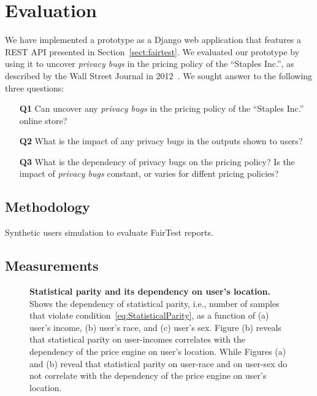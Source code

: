 \section{Evaluation}
\label{sect:evaluation}

We have implemented a \sysname prototype as a Django web application
that features a REST API presented in Section~\ref{sect:fairtest}.
We evaluated our prototype by using it to uncover {\it privacy bugs}
in the pricing policy of the ``Staples Inc.'', as described by the
Wall Street Journal in 2012~\cite{Staples}. We sought answer to
the following three questions:

\begin{enumerate}
  \item[{\bf Q1}] Can \sysname uncover any {\em privacy bugs} in the
    pricing policy of the ``Staples Inc.'' online store?
  \item[{\bf Q2}] What is the impact of any privacy bugs in the outputs
    shown to users?
  \item[{\bf Q3}] What is the dependency of privacy bugs on the 
    pricing policy? Is the impact of {\em privacy bugs} constant,
    or varies for diffent pricing policies?
\end{enumerate}

\subsection{Methodology}

Synthetic users simulation to evaluate FairTest reports.

\subsection{Measurements}

\begin{figure*}[t]
{
 \caption{\textbf{Statistical parity and its dependency on user's location.}
          Shows the dependency of statistical parity, i.e., number of samples that
          violate condition~\ref{eq:StatisticalParity}, as a function of (a) user's income,
          (b) user's race, and (c) user's sex. Figure (b) reveals that statistical parity on
          user-incomes correlates with the dependency of the price engine on user's location.
          While Figures (a) and (b) reveal that statistical parity on user-race and on user-sex
          do not correlate with the dependency of the price engine on user's location.}
}
\end{figure*}


